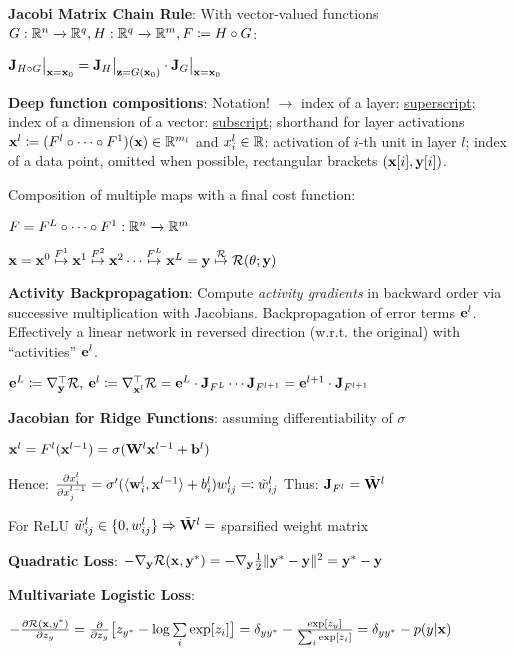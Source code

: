     \textbf{Jacobi Matrix Chain Rule}: With vector-valued functions $G:\mathbb R^n\xrightarrow{}\mathbb R^q,H:\mathbb R^q\xrightarrow{}\mathbb R^m,F\coloneqq H\circ G$:
    
    \tab$\mathbf J_{H \circ G}\bigr|_{\mathbf x=\mathbf x_0}=\mathbf J_{H}\bigr|_{\mathbf z=G(\mathbf x_0)}\cdot\mathbf J_{G}\bigr|_{\mathbf x=\mathbf x_0}$
    
    \textbf{Deep function compositions}: Notation! $\xrightarrow{}$ index of a layer: \underline{superscript}; index of a dimension of a vector: \underline{subscript}; shorthand for layer activations $\mathbf x^l\coloneqq(F^l\circ\cdots\circ F^1)(\mathbf x)\in\mathbb R^{m_l}$ and $x_i^l\in\mathbb R$: activation of $i$-th unit in layer $l$; index of a data point, omitted when possible, rectangular brackets $(\mathbf x\lbrack i \rbrack,\mathbf y\lbrack i \rbrack)$.
    
    Composition of multiple maps with a final cost function:
    
    \tab$F=F^L\circ\cdots\circ F^1:\mathbb R^n\xrightarrow{}\mathbb R^m$
    
    \tab$\mathbf x=\mathbf x^0\overset{F^1}{\mapsto}\mathbf x^1\overset{F^2}{\mapsto}\mathbf x^2\cdots\overset{F^L}{\mapsto}\mathbf x^L=\mathbf y\overset{\mathcal{R}}{\mapsto}\mathcal{R}(\theta;\mathbf y)$
    
    \textbf{Activity Backpropagation}: Compute \emph{activity gradients} in backward order via successive multiplication with Jacobians. Backpropagation of error terms $\mathbf e^l$. Effectively a linear network in reversed direction (w.r.t. the original) with ``activities'' $\mathbf e^l$.
    
    \tab$\mathbf e^L\coloneqq\nabla^{\mathop{\mathrm{\top}}}_\mathbf y\mathcal{R},\> \mathbf e^l\coloneqq\nabla^{\mathop{\mathrm{\top}}}_{\mathbf x^l}\mathcal{R}=\mathbf e^L\cdot\mathbf J_{F^L}\cdots\mathbf J_{F^{l+1}}=\mathbf e^{l+1}\cdot\mathbf J_{F^{l+1}}$
    
    \textbf{Jacobian for Ridge Functions}: assuming differentiability of $\sigma$
    
    \tab$\mathbf x^l=F^l(\mathbf x^{l-1})=\sigma(\mathbf W^l\mathbf x^{l-1}+\mathbf b^l)$
    
    Hence: $\frac{\partial x_i^l}{\partial x_j^{l-1}}=\sigma'(\langle\mathbf w^l_i,\mathbf x^{l-1}\rangle+b^l_i)w^l_{ij}\eqqcolon\Tilde{w}^l_{ij}$
    Thus: $\mathbf J_{F^l}=\Tilde{\mathbf W}^l$
    
    For ReLU $\Tilde{w}^l_{ij}\in\{0,w^l_{ij}\} \Rightarrow\Tilde{\mathbf W}^l =$ sparsified weight matrix
    
    \textbf{Quadratic Loss}: $-\nabla_\mathbf y\mathcal{R}(\mathbf x,\mathbf y^*)=-\nabla_\mathbf y\frac{1}{2}\lVert\mathbf y^*-\mathbf y\rVert^2=\mathbf y^*-\mathbf y$
    
    \textbf{Multivariate Logistic Loss}:
    
    $-\frac{\partial\mathcal{R}(\mathbf x,y^*)}{\partial z_y}=\frac{\partial}{\partial z_y}\bigr\lbrack z_{y^*}-\log\sum\limits_i\exp\lbrack z_i \rbrack \bigr\rbrack=\delta_{yy^*}-\frac{\exp\lbrack z_y\rbrack}{\sum_i\exp\lbrack z_i\rbrack}=\delta_{yy^*}-p(y|\mathbf x)$
    
